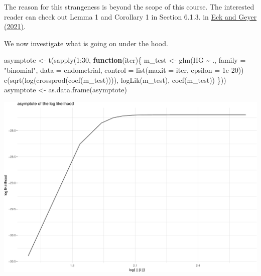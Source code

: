 \documentclass[
  ignorenonframetext,
]{beamer}
\newenvironment{Shaded}{\begin{snugshade}}{\end{snugshade}}
\newcommand{\AttributeTok}[1]{\textcolor[rgb]{0.77,0.63,0.00}{#1}}
\newcommand{\ControlFlowTok}[1]{\textcolor[rgb]{0.13,0.29,0.53}{\textbf{#1}}}
\newcommand{\DecValTok}[1]{\textcolor[rgb]{0.00,0.00,0.81}{#1}}
\newcommand{\FloatTok}[1]{\textcolor[rgb]{0.00,0.00,0.81}{#1}}
\newcommand{\FunctionTok}[1]{\textcolor[rgb]{0.00,0.00,0.00}{#1}}
\newcommand{\NormalTok}[1]{#1}
\newcommand{\OtherTok}[1]{\textcolor[rgb]{0.56,0.35,0.01}{#1}}
\newcommand{\SpecialCharTok}[1]{\textcolor[rgb]{0.00,0.00,0.00}{#1}}
\newcommand{\StringTok}[1]{\textcolor[rgb]{0.31,0.60,0.02}{#1}}
\begin{document}
\begin{frame}[fragile]{}
\protect\hypertarget{section-20}{}
The reason for this strangeness is beyond the scope of this course. The
interested reader can check out Lemma 1 and Corollary 1 in Section
6.1.3. in
\href{https://projecteuclid.org/journals/electronic-journal-of-statistics/volume-15/issue-1/Computationally-efficient-likelihood-inference-in-exponential-families-when-the-maximum/10.1214/21-EJS1815.full}{Eck
and Geyer (2021)}.

\vspace{12pt}

We now investigate what is going on under the hood.

\vspace{12pt}
\tiny

\begin{Shaded}
\begin{Highlighting}[]
\NormalTok{asymptote }\OtherTok{\textless{}{-}} \FunctionTok{t}\NormalTok{(}\FunctionTok{sapply}\NormalTok{(}\DecValTok{1}\SpecialCharTok{:}\DecValTok{30}\NormalTok{, }\ControlFlowTok{function}\NormalTok{(iter)\{}
\NormalTok{  m\_test }\OtherTok{\textless{}{-}} \FunctionTok{glm}\NormalTok{(HG }\SpecialCharTok{\textasciitilde{}}\NormalTok{ ., }\AttributeTok{family =} \StringTok{"binomial"}\NormalTok{, }\AttributeTok{data =}\NormalTok{ endometrial, }
                \AttributeTok{control =} \FunctionTok{list}\NormalTok{(}\AttributeTok{maxit =}\NormalTok{ iter, }\AttributeTok{epsilon =} \FloatTok{1e{-}20}\NormalTok{))}
  \FunctionTok{c}\NormalTok{(}\FunctionTok{sqrt}\NormalTok{(}\FunctionTok{log}\NormalTok{(}\FunctionTok{crossprod}\NormalTok{(}\FunctionTok{coef}\NormalTok{(m\_test)))), }\FunctionTok{logLik}\NormalTok{(m\_test), }\FunctionTok{coef}\NormalTok{(m\_test))}
\NormalTok{\}))}
\NormalTok{asymptote }\OtherTok{\textless{}{-}} \FunctionTok{as.data.frame}\NormalTok{(asymptote)}
\end{Highlighting}
\end{Shaded}
\end{frame}

\begin{frame}{}
\protect\hypertarget{section-21}{}
\includegraphics{week7_p2_files/figure-beamer/unnamed-chunk-21-1.pdf}
\end{frame}
\end{document}
